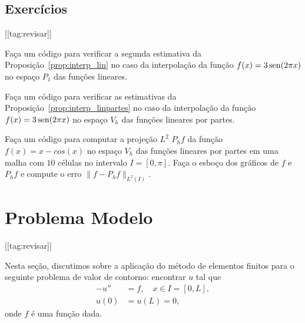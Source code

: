 
% 

\subsection{Exercícios}
[[tag:revisar]]

\begin{exer}
  Faça um código para verificar a segunda estimativa da Proposição~\ref{prop:interp_lin} no caso da interpolação da função $f(x) = 3\operatorname{sen}(2\pi x)$ no espaço $P_1$ das funções lineares.
\end{exer}


\begin{exer}
  Faça um código para verificar as estimativas da Proposição~\ref{prop:interp_linpartes} no caso da interpolação da função $f(x) = 3\operatorname{sen}(2\pi x)$ no espaço $V_h$ das funções lineares por partes.
\end{exer}

\begin{exer}
  Faça um código para computar a projeção $L^2$ $P_hf$ da função $f(x) = x - cos(x)$ no espaço $V_h$ das funções lineares por partes em uma malha com $10$ células no intervalo $I = [0, \pi]$. Faça o esboço dos gráficos de $f$ e $P_hf$ e compute o erro $\|f-P_hf\|_{L^2(I)}$.
\end{exer}

\section{Problema Modelo}\label{cap_mef1d_sec_modelo}
[[tag:revisar]]

Nesta seção, discutimos sobre a aplicação do método de elementos finitos para o seguinte problema de valor de contorno: encontrar $u$ tal que
\begin{align}
  -u'' &= f,\quad x\in I=[0,L],\label{eq:prob_eq}\\
  u(0) &= u(L) = 0,\label{eq:prob_bc}
\end{align}
onde $f$ é uma função dada.

